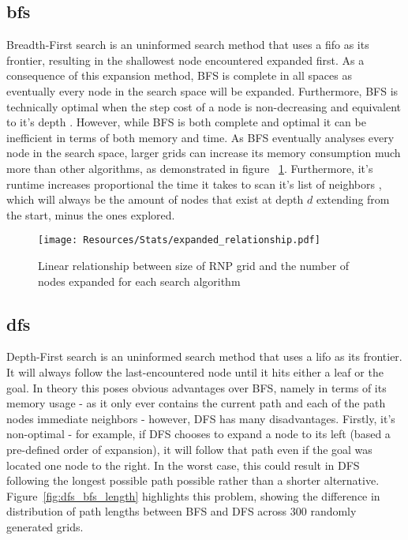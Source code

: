 \subsection{\texorpdfstring{\acrfull{bfs}}{BFS}} %
\label{sub:bfs}
Breadth-First search is an uninformed search method that uses a \acrfull{fifo} as its frontier, resulting in the shallowest node encountered expanded first. As a consequence of this expansion method, BFS is \gls{complete} in all spaces as eventually every node in the search space will be expanded. Furthermore, BFS is technically \gls{optimal} when the step cost of a node is non-decreasing and equivalent to it's depth \parencite[82]{aiama}. However, while BFS is both complete and optimal it can be inefficient in terms of both memory and time. As BFS eventually analyses every node in the search space, larger grids can increase its memory consumption much more than other algorithms, as demonstrated in figure ~\ref{fig:expanded_relationship}. Furthermore, it's runtime increases proportional the time it takes to scan it's list of neighbors \parencite[597]{introalgos}, which will always be the amount of nodes that exist at depth $d$ extending from the start, minus the ones explored.

\begin{figure}[H]
	\label{fig:expanded_relationship}
	\centerline{
		\texttt{[image: Resources/Stats/expanded\_relationship.pdf]}
	}
	\caption{Linear relationship between size of RNP grid and the number of nodes expanded for each search algorithm}
\end{figure}

\subsection{\texorpdfstring{\acrfull{dfs}}{DFS}} %
\label{sub:dfs}
Depth-First search is an uninformed search method that uses a \acrfull{lifo} as its frontier. It will always follow the last-encountered node until it hits either a \gls{leaf} or the goal. In theory this poses obvious advantages over BFS, namely in terms of its memory usage - as it only ever contains the current path and each of the path nodes immediate neighbors - however, DFS has many disadvantages. Firstly, it's non-optimal - for example, if DFS chooses to expand a node to its left (based a pre-defined order of expansion), it will follow that path even if the goal was located one node to the right. In the worst case, this could result in DFS following the longest possible path possible rather than a shorter alternative. Figure~\ref{fig:dfs_bfs_length} highlights this problem, showing the difference in distribution of path lengths between BFS and DFS across 300 randomly generated grids.

